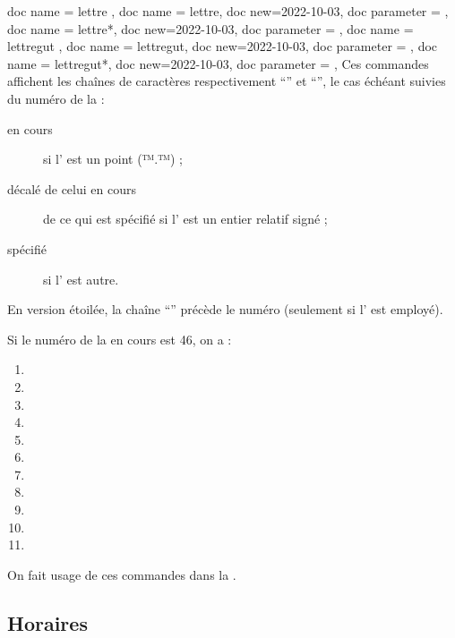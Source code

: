 \documentclass{letgut}
\begin{document}
\begin{docCommands}[]
  {
    { doc name = lettre },
    { doc name = lettre,  doc new=2022-10-03, doc parameter =  },
    { doc name = lettre*, doc new=2022-10-03, doc parameter =  },
    { doc name = lettregut },
    { doc name = lettregut,  doc new=2022-10-03, doc parameter =  },
    { doc name = lettregut*, doc new=2022-10-03, doc parameter =  },
  }
  Ces commandes affichent les chaînes de caractères respectivement
  \enquote{} et \enquote{}, le cas échéant suivies du numéro
  de la  :
  \begin{description}
  \item[en cours] si l' est un point (™.™) ;
  \item[décalé de celui en cours] de ce qui est spécifié si l' est un
    entier relatif signé ;
  \item[spécifié] si l' est autre.
  \end{description}
  En version étoilée, la chaîne \enquote{\no{}} précède le numéro (seulement si
  l' est employé).
\end{docCommands}

\begin{ltx-code-result}[title addon=emplois des commandes \refCom{lettre} et \refCom{lettregut},listing options app={deletekeywords={[6]{cours,lettre}}}]
Si le numéro de la  en cours est 46, on a :
\begin{enumerate}
\item {}
\item {}
\item {}
\item {}
\item {}
\item {}
\item {}
\item {}
\item {}
\item {}
\item {}
\end{enumerate}
On fait usage de ces commandes dans la .
\end{ltx-code-result}

\subsection{Horaires}
\label{sec:horaires}
\end{document}
